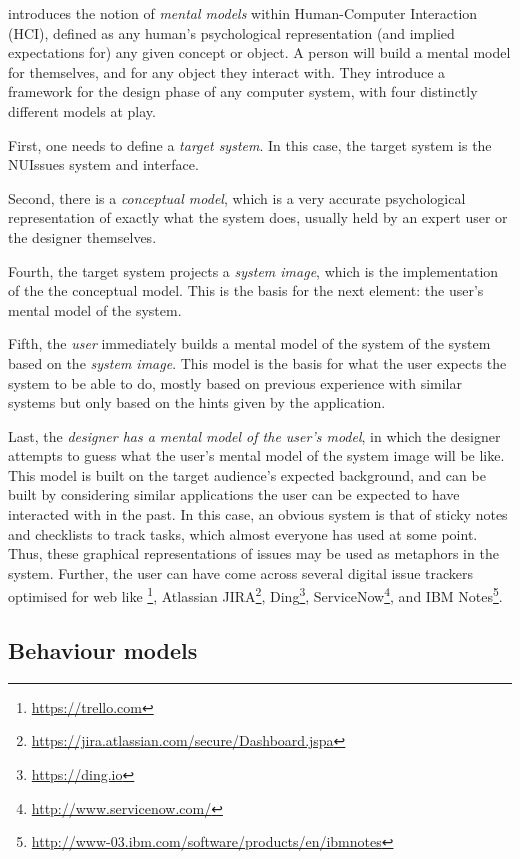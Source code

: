 \textcite{wilson-rutherford:mental-models-theory-and-application-in-human-factors:1989} introduces the notion of \textit{mental models} within Human-Computer Interaction (HCI), defined as any human's psychological representation (and implied expectations for) any given concept or object. A person will build a mental model for themselves, and for any object they interact with. They introduce a framework for the design phase of any computer system, with four distinctly different models at play.

First, one needs to define a \textit{target system}. In this case, the target system is the NUIssues system and interface.

Second, there is a \textit{conceptual model}, which is a very accurate psychological representation of exactly what the system does, usually held by an expert user or the designer themselves.

Fourth, the target system projects a \textit{system image}, which is the implementation of the the conceptual model. This is the basis for the next element: the user's mental model of the system.

Fifth, the \textit{user} immediately builds a mental model of the system of the system based on the \textit{system image}. This model is the basis for what the user expects the system to be able to do, mostly based on previous experience with similar systems but only based on the hints given by the application.

Last, the \textit{designer has a mental model of the user's model}, in which the designer attempts to guess what the user's mental model of the system image will be like. This model is built on the target audience's expected background, and can be built by considering similar applications the user can be expected to have interacted with in the past. In this case, an obvious system is that of sticky notes and checklists to track tasks, which almost everyone has used at some point. Thus, these graphical representations of issues may be used as metaphors in the system. Further, the user can have come across several digital issue trackers optimised for web like \footnote{\url{https://trello.com}}, Atlassian JIRA\footnote{\url{https://jira.atlassian.com/secure/Dashboard.jspa}}, Ding\footnote{\url{https://ding.io}}, ServiceNow\footnote{\url{http://www.servicenow.com/}}, and IBM Notes\footnote{\url{http://www-03.ibm.com/software/products/en/ibmnotes}}.

\subsection{Behaviour models}

